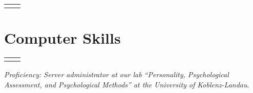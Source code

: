 \documentclass[10pt]{FreemanCV}
\begin{document}
\begin{paracol}{2}
\begin{supertabular}{r l}
	

\end{supertabular}


\section{Computer Skills} 




\begin{supertabular}{r l}
	

	



	
\end{supertabular}

\textit{Proficiency: Server administrator at our lab \enquote{Personality,
Psychological Assessment, and Psychological Methods} at the University of
Koblenz-Landau}.



\end{paracol}
\end{document}
